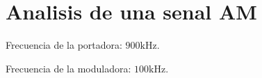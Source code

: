\chapter{Analisis de una senal AM}
Frecuencia de la portadora: $900 \si{\kilo\hertz}$.

Frecuencia de la moduladora: $100 \si{\kilo\hertz}$.